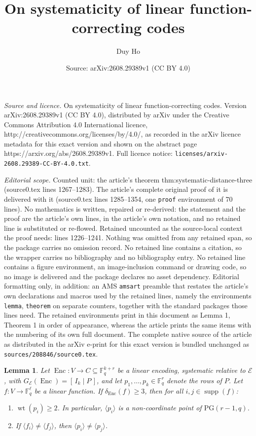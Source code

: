 \documentclass[10pt,a4paper]{amsart}
\title{On systematicity of linear function-correcting codes}
\author{Duy Ho}
\date{Source: arXiv:2608.29389v1 (CC BY 4.0)}
\newtheorem{lemma}{Lemma}
\newcommand{\Enc}{\operatorname{Enc}}
\newcommand{\F}{\mathbb F}
\newcommand{\wt}{\operatorname{wt}}
\begin{document}
\maketitle

\noindent\emph{Source and licence.} On systematicity of linear function-correcting codes. Version arXiv:2608.29389v1 (CC BY 4.0), distributed by arXiv under the Creative Commons Attribution 4.0 International licence, http://creativecommons.org/licenses/by/4.0/, as recorded in the arXiv licence metadata for this exact version and shown on the abstract page https://arxiv.org/abs/2608.29389v1. Full licence notice: \texttt{licenses/arxiv-2608.29389-CC-BY-4.0.txt}.\par\smallskip

\noindent\textit{Editorial scope.} Counted unit: the article's theorem thm:systematic-distance-three (source0.tex lines 1267--1283). The article's complete original proof of it is delivered with it (source0.tex lines 1285--1354, one \texttt{proof} environment of 70 lines). No mathematics is written, repaired or re-derived: the statement and the proof are the article's own lines, in the article's own notation, and no retained line is substituted or re-flowed.  Retained uncounted as the source-local context the proof needs: lines 1226--1241.  Nothing was omitted from any retained span, so the package carries no omission record.  No retained line contains a citation, so the wrapper carries no bibliography and no bibliography entry.  No retained line contains a figure environment, an image-inclusion command or drawing code, so no image is delivered and the package declares no asset dependency.  Editorial formatting only, in addition: an AMS \texttt{amsart} preamble that restates the article's own declarations and macros used by the retained lines, namely the environments \texttt{lemma}, \texttt{theorem} on separate counters, together with the standard packages those lines need.  The retained environments print in this document as Lemma 1, Theorem 1 in order of appearance, whereas the article prints the same items with the numbering of its own full document.  The complete native source of the article as distributed in the arXiv e-print for this exact version is bundled unchanged as \texttt{sources/208846/source0.tex}.
\begin{lemma}
\label{lem:distance-three-rows}
Let $\Enc\colon V\to C\subseteq\F_q^{k+r}$ be a linear encoding,
systematic relative to $\mathcal E$, with
$G_{\mathcal E}(\Enc)=[\,I_k\mid P\,]$, and let
$p_1,\dots,p_k\in\F_q^r$ denote the rows of $P$. Let
$f\colon V\to\F_q^\ell$ be a linear function. If
$\delta_{\Enc}(f)\geq3$, then for all
$i,j\in\operatorname{supp}(f)$:
\begin{enumerate}
\item $\wt(p_i)\geq2$. In particular, $\langle p_i\rangle$ is a
non-coordinate point of $\mathrm{PG}(r-1,q)$.
\item If $\langle f_i\rangle\neq\langle f_j\rangle$, then
$\langle p_i\rangle\neq\langle p_j\rangle$.
\end{enumerate}
\end{lemma}
\end{document}
